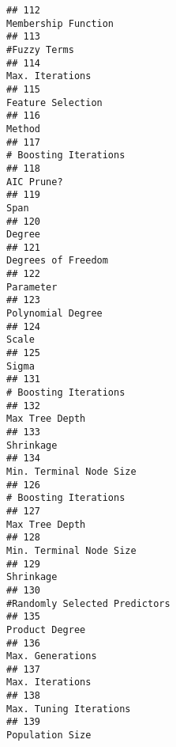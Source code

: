 \documentclass[
]{article}
\begin{document}
\begin{verbatim}
## 112                                                                     Membership Function
## 113                                                                            #Fuzzy Terms
## 114                                                                         Max. Iterations
## 115                                                                       Feature Selection
## 116                                                                                  Method
## 117                                                                   # Boosting Iterations
## 118                                                                              AIC Prune?
## 119                                                                                    Span
## 120                                                                                  Degree
## 121                                                                      Degrees of Freedom
## 122                                                                               Parameter
## 123                                                                       Polynomial Degree
## 124                                                                                   Scale
## 125                                                                                   Sigma
## 131                                                                   # Boosting Iterations
## 132                                                                          Max Tree Depth
## 133                                                                               Shrinkage
## 134                                                                 Min. Terminal Node Size
## 126                                                                   # Boosting Iterations
## 127                                                                          Max Tree Depth
## 128                                                                 Min. Terminal Node Size
## 129                                                                               Shrinkage
## 130                                                           #Randomly Selected Predictors
## 135                                                                          Product Degree
## 136                                                                        Max. Generations
## 137                                                                         Max. Iterations
## 138                                                                  Max. Tuning Iterations
## 139                                                                         Population Size

\end{verbatim}
\end{document}
